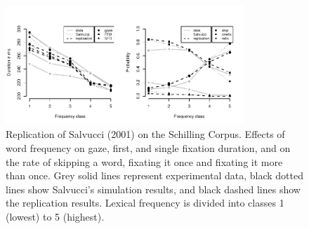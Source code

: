 \begin{figure}[!htbp]
\begin{center}
\includegraphics[width=0.8\textwidth]{figures/fig-src-fstat}
\end{center}
\caption{Replication of Salvucci (2001) on the Schilling Corpus. Effects of word frequency on gaze, first, and single fixation duration, and on the rate of skipping a word, fixating it once and fixating it more than once.  Grey solid lines represent experimental data, black dotted lines show Salvucci's simulation results, and black dashed lines show the replication results.  Lexical frequency is divided into classes 1 (lowest) to 5 (highest).}
\label{fig:src-fstat}
\end{figure}

